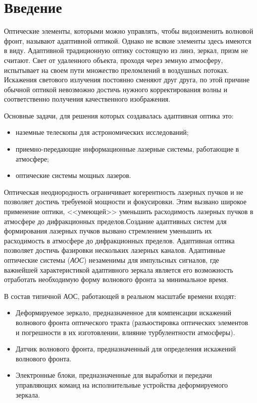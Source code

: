 \documentclass[pscyr]{hedwork}
\begin{document}
\maketitle
\onehalfspacing

\section*{Введение}

Оптические элементы, которыми можно управлять, чтобы видоизменить волновой
фронт, называют адаптивной оптикой. Однако не всякие элементы здесь имеются в
виду. Адаптивной традиционную оптику состоящую из линз, зеркал, призм не
считают. Свет от удаленного объекта, проходя через земную атмосферу, испытывает
на своем пути множество преломлений в воздушных потоках. Искажения светового
излучения постоянно сменяют друг друга, по этой причине обычной оптикой
невозможно достичь нужного корректирования волны и соответственно получения
качественного изображения.

Основные задачи, для решения которых создавалась адаптивная оптика это:
\begin{itemize}
  \item наземные телескопы для астрономических исследований;
  \item приемно-передающие информационные лазерные системы, работающие в
    атмосфере;
  \item оптические системы мощных лазеров.
\end{itemize}

Оптическая неоднородность ограничивает когерентность лазерных пучков и не
позволяет достичь требуемой мощности и фокусировки. Этим вызвано широкое
применение оптики, <<умеющей>> уменьшить расходимость лазерных пучков в
атмосфере до дифракционных пределов.Создание адаптивных систем для формирования
лазерных пучков вызвано стремлением уменьшить их расходимость в атмосфере до
дифракционных пределов. Адаптивная оптика позволяет достичь фазировки нескольких
лазерных каналов. Адаптивные оптические системы (\emph{АОС}) незаменимы для
импульсных сигналов, где важнейшей характеристикой адаптивного зеркала является
его возможность отработать необходимую форму волнового фронта за минимальное
время.

В состав типичной АОС, работающей в реальном масштабе времени входят:
\begin{itemize}
  \item Деформируемое зеркало, предназначенное для компенсации искажений
    волнового фронта оптического тракта (разъюстировка оптических элементов и
    погрешности в их изготовлении, влияние турбулентности атмосферы).
  \item Датчик волнового фронта, предназначенный для определения искажений
    волнового фронта. 
  \item Электронные блоки, предназначенные для выработки и передачи управляющих
  команд на исполнительные устройства деформируемого зеркала.
\end{itemize}
\end{document}
